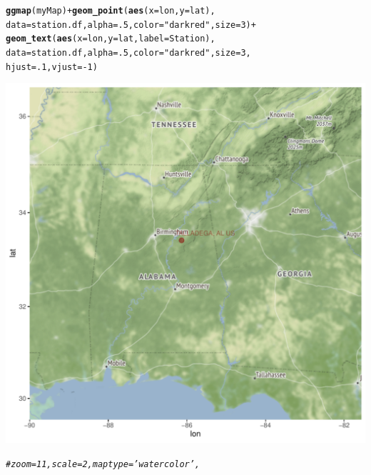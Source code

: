 \documentclass{article}\usepackage[]{graphicx}\usepackage[]{color}
\makeatletter
\def\maxwidth{ %
  \ifdim\Gin@nat@width>\linewidth
    \linewidth
  \else
    \Gin@nat@width
  \fi
}
\newcommand{\hlnum}[1]{\textcolor[rgb]{0.686,0.059,0.569}{#1}}%
\newcommand{\hlstr}[1]{\textcolor[rgb]{0.192,0.494,0.8}{#1}}%
\newcommand{\hlcom}[1]{\textcolor[rgb]{0.678,0.584,0.686}{\textit{#1}}}%
\newcommand{\hlopt}[1]{\textcolor[rgb]{0,0,0}{#1}}%
\newcommand{\hlstd}[1]{\textcolor[rgb]{0.345,0.345,0.345}{#1}}%
\newcommand{\hlkwc}[1]{\textcolor[rgb]{0.333,0.667,0.333}{#1}}%
\newcommand{\hlkwd}[1]{\textcolor[rgb]{0.737,0.353,0.396}{\textbf{#1}}}%
\newenvironment{kframe}{%
 \def\at@end@of@kframe{}%
 \ifinner\ifhmode%
  \def\at@end@of@kframe{\end{minipage}}%
  \begin{minipage}{\columnwidth}%
 \fi\fi%
 \def\FrameCommand##1{\hskip\@totalleftmargin \hskip-\fboxsep
 \colorbox{shadecolor}{##1}\hskip-\fboxsep
     \hskip-\linewidth \hskip-\@totalleftmargin \hskip\columnwidth}%
 \MakeFramed {\advance\hsize-\width
   \@totalleftmargin\z@ \linewidth\hsize
   \@setminipage}}%
 {\par\unskip\endMakeFramed%
 \at@end@of@kframe}
\newenvironment{knitrout}{}{} %
\makeatother
\begin{document}
\begin{knitrout}
\begin{kframe}
{\ttfamily\noindent\itshape\color{messagecolor}{\#\# Source : http://tile.stamen.com/terrain/7/33/51.png}}

{\ttfamily\noindent\itshape\color{messagecolor}{\#\# Source : http://tile.stamen.com/terrain/7/34/51.png}}

{\ttfamily\noindent\itshape\color{messagecolor}{\#\# Source : http://tile.stamen.com/terrain/7/32/52.png}}

{\ttfamily\noindent\itshape\color{messagecolor}{\#\# Source : http://tile.stamen.com/terrain/7/33/52.png}}

{\ttfamily\noindent\itshape\color{messagecolor}{\#\# Source : http://tile.stamen.com/terrain/7/34/52.png}}\begin{alltt}
\hlkwd{ggmap}\hlstd{(myMap)} \hlopt{+} \hlkwd{geom_point}\hlstd{(}\hlkwd{aes}\hlstd{(}\hlkwc{x} \hlstd{= lon,} \hlkwc{y} \hlstd{= lat),}
      \hlkwc{data} \hlstd{= station.df,} \hlkwc{alpha} \hlstd{=} \hlnum{.5}\hlstd{,} \hlkwc{color}\hlstd{=}\hlstr{"darkred"}\hlstd{,} \hlkwc{size} \hlstd{=} \hlnum{3}\hlstd{)} \hlopt{+}
      \hlkwd{geom_text}\hlstd{(}\hlkwd{aes}\hlstd{(}\hlkwc{x} \hlstd{= lon,} \hlkwc{y} \hlstd{= lat,} \hlkwc{label}\hlstd{=Station),}
      \hlkwc{data} \hlstd{= station.df,} \hlkwc{alpha} \hlstd{=} \hlnum{.5}\hlstd{,} \hlkwc{color}\hlstd{=}\hlstr{"darkred"}\hlstd{,} \hlkwc{size} \hlstd{=} \hlnum{3}\hlstd{,}
      \hlkwc{hjust}\hlstd{=}\hlnum{.1}\hlstd{,} \hlkwc{vjust}\hlstd{=}\hlopt{-}\hlnum{1}\hlstd{)}
\end{alltt}
\end{kframe}
\includegraphics[width=\maxwidth]{figure/unnamed-chunk-4-1} 
\begin{kframe}\begin{alltt}
\hlcom{#zoom = 11, scale = 2, maptype ='watercolor',}


\end{alltt}
\end{kframe}
\end{knitrout}
\end{document}

